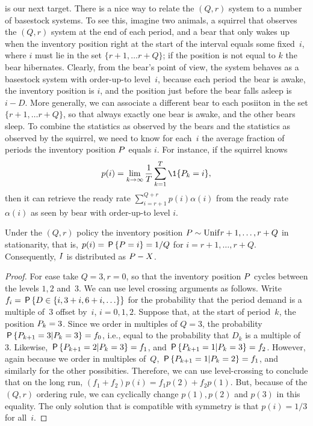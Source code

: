 \documentclass[stochastic-or.tex]{subfiles}
\begin{document}
 is our next target.
There is a nice way to relate the $(Q,r)$ system to a number of basestock systems.
To see this, imagine two animals, a squirrel that observes the $(Q,r)$ system at the end of each period, and a bear that only wakes up when the inventory position right at the start of the interval equals some fixed~$i$, where $i$ must lie in the set $\{r+1, \ldots r+Q\}$; if the position is not equal to $k$ the bear hibernates.
Clearly, from the bear's point of view, the system behaves as a basestock system with order-up-to level~$i$, because each period the bear is awake, the inventory position is $i$, and the position just before the bear falls asleep is $i-D$.
More generally, we can associate a different bear to each posiiton in the set $\{r+1, \ldots r+Q\}$, so that always exactly one bear is awake, and the other bears sleep.
To combine the statistics as observed by the bears and the statistics as observed by the squirrel, we need to know for each~$i$ the average fraction of periods the inventory position $\IP$ equals $i$.
For instance, if the squirrel knows
\begin{equation*}
p(i) = \lim_{k\to \infty} \frac{1}{T} \sum_{k=1}^{T}\1{\IP_k = i},
\end{equation*}
then it can retrieve the ready rate $\sum_{i=r+1}^{Q+r} p(i) \alpha(i)$ from the ready rate $\alpha(i)$ as seen by bear with order-up-to level $i$.


\begin{theorem}\label{thr:3}
Under the $(Q,r)$ policy the inventory position $\IP \sim \Unif{r+1, \ldots, r+Q}$ in stationarity, that is, $p(i) = \P{\IP = i} = 1/Q$ for $i=r+1, \ldots, r+Q$.
Consequently, $\IL$ is distributed as $\IP-X$.
\end{theorem}
\begin{proof}
For ease take $Q=3, r=0$, so that the inventory position $\IP$ cycles between the levels $1, 2$ and~$3$.
We can use level crossing arguments as follows.
Write $f_{i} = \P{D\in \{i, 3+i, 6+i, \ldots\}}$ for the probability that the period demand is a multiple of~$3$ offset by~$i$, $i=0, 1, 2$.
Suppose that, at the start of period~$k$, the position $\IP_{k} = 3$.
Since we order in multiples of $Q=3$, the probability $\P{\IP_{k+1} =3|\IP_{k}=3} = f_{0}$, i.e., equal to the probability that $D_{k}$ is a multiple of~$3$.
Likewise, $\P{\IP_{k+1} = 2|\IP_k=3} = f_{1}$, and $\P{\IP_{k+1} = 1|\IP_k=3} = f_{2}$.
However, again because we order in multiples of~$Q$, $\P{\IP_{k+1} = 1|\IP_k=2} = f_{1}$, and similarly for the other possibities.
Therefore, we can use level-crossing to conclude that on the long run, $(f_{1}+f_2)p(i) = f_1p(2) + f_2 p(1)$.
But, because of the $(Q,r)$ ordering rule, we can cyclically change $p(1), p(2)$ and $p(3)$ in this equality.
The only solution that is compatible with symmetry is that $p(i) = 1/3$ for all~$i$.
\end{proof}
\end{document}
